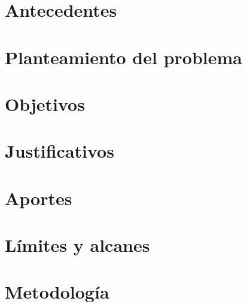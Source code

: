 \section{Antecedentes}
\section{Planteamiento del problema}
\section{Objetivos}
\section{Justificativos}
\section{Aportes}
\section{L\'imites y alcanes}
\section{Metodolog\'ia}
